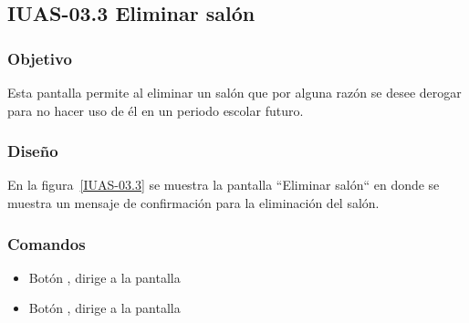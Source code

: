 \subsection{IUAS-03.3 Eliminar salón}

\subsubsection{Objetivo}

	
    Esta pantalla permite al  eliminar un salón que por alguna razón se desee derogar para no hacer uso de él en un periodo escolar futuro.
\subsubsection{Diseño}


    En la figura~\ref{IUAS-03.3} se muestra la pantalla ``Eliminar salón“  en donde se muestra un mensaje de confirmación para la eliminación del salón.
    



\subsubsection{Comandos}
    \begin{itemize}

	\item Botón , dirige a la pantalla  
	\item Botón , dirige a la pantalla  
    \end{itemize}
